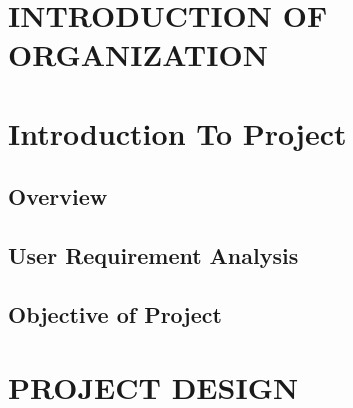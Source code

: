 \documentclass[12pt]{report}
\begin{document}

\begin{screen}
\ppttitle
\end{screen}
\footskip 0.7cm
\thispagestyle{empty} 
\pagetitle
\newpage
{}
\cfoot{\thepage}


\newpage


%

\newpage
\tableofcontents
\newpage
\listoffigures
\newpage
\listoftables
\newpage


\cfoot{\thepage}

\newpage
\chapter{INTRODUCTION OF ORGANIZATION}

\newpage
%
\chapter{Introduction To Project}

\section{Overview}



\section{User Requirement Analysis} 




\section{Objective of Project}

\chapter{PROJECT DESIGN}



\end{document}
